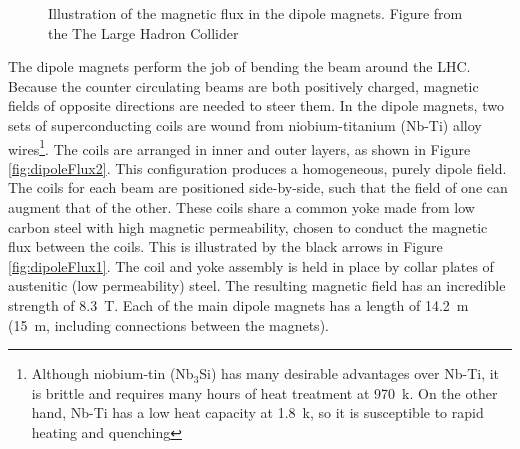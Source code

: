 \begin{figure}[h!]
\captionsetup[subfigure]{position=b}
\centering
{}
\caption{Illustration of the magnetic flux in the dipole magnets. Figure from the The Large Hadron Collider \cite{lyndon}}
\label{fig:dipoleFlux}
\end{figure}

The dipole magnets perform the job of bending the beam around the LHC.
Because the counter circulating beams are both positively charged, magnetic fields of opposite directions are needed to steer them.
In the dipole magnets, two sets of superconducting coils are wound from niobium-titanium (Nb-Ti) alloy wires\footnote{Although niobium-tin (Nb$_3$Si) has many desirable advantages over Nb-Ti, it is brittle and requires many hours of heat treatment at 970~k. On the other hand, Nb-Ti has a low heat capacity at 1.8~k, so it is susceptible to rapid heating and quenching}.
The coils are arranged in inner and outer layers, as shown in Figure \ref{fig:dipoleFlux2}.
This configuration produces a homogeneous, purely dipole field.
The coils for each beam are positioned side-by-side, such that the field of one can augment that of the other.
These coils share a common yoke made from low carbon steel with high magnetic permeability, chosen to conduct the magnetic flux between the coils.
This is illustrated by the black arrows in Figure \ref{fig:dipoleFlux1}.
The coil and yoke assembly is held in place by collar plates of austenitic (low permeability) steel.
The resulting magnetic field has an incredible strength of 8.3~T.
Each of the main dipole magnets has a length of 14.2~m (15~m, including connections between the magnets).

